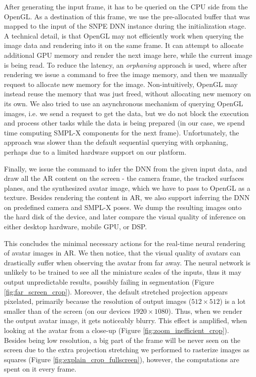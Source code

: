 After generating the input frame, it has to be queried on the CPU side from the OpenGL. As a destination of this frame, we use the pre-allocated buffer that was mapped to the input of the SNPE DNN instance during the initialization stage. A technical detail, is that OpenGL may not efficiently work when querying the image data and rendering into it on the same frame. It can attempt to allocate additional GPU memory and render the next image here, while the current image is being read. To reduce the latency, an \textit{orphaning} approach is used, where after rendering we issue a command to free the image memory, and then we manually request to allocate new memory for the image. Non-intuitively, OpenGL may instead reuse the memory that was just freed, without allocating new memory on its own. We also tried to use an asynchronous mechanism of querying OpenGL images, i.e. we send a request to get the data, but we do not block the execution and process other tasks while the data is being prepared (in our case, we spend time computing SMPL-X components for the next frame). Unfortunately, the approach was slower than the default sequential querying with orphaning, perhaps due to a limited hardware support on our platform.

Finally, we issue the command to infer the DNN from the given input data, and draw all the AR content on the screen - the camera frame, the tracked surfaces planes, and the synthesized avatar image, which we have to pass to OpenGL as a texture. Besides rendering the content in AR, we also support inferring the DNN on predefined camera and SMPL-X poses. We dump the resulting images onto the hard disk of the device, and later compare the visual quality of inference on either desktop hardware, mobile GPU, or DSP.

This concludes the minimal necessary actions for the real-time neural rendering of avatar images in AR. We then notice, that the visual quality of avatars can drastically suffer when observing the avatar from far away. The neural network is unlikely to be trained to see all the miniature scales of the inputs, thus it may output unpredictable results, possibly failing in segmentation (Figure \ref{fig:far_screen_crop}). Moreover, the default stretched projection appears pixelated, primarily because the resolution of output images ($512 \times 512$) is a lot smaller than of the screen (on our devices $1920 \times 1080$). Thus, when we render the output avatar image, it gets noticeably blurry. This effect is amplified, when looking at the avatar from a close-up (Figure \ref{fig:zoom_inefficient_crop}). Besides being low resolution, a big part of the frame will be never seen on the screen due to the extra projection stretching we performed to rasterize images as squares (Figure \ref{fig:explain_crop_fullscreen}), however, the computations are spent on it every frame. 

